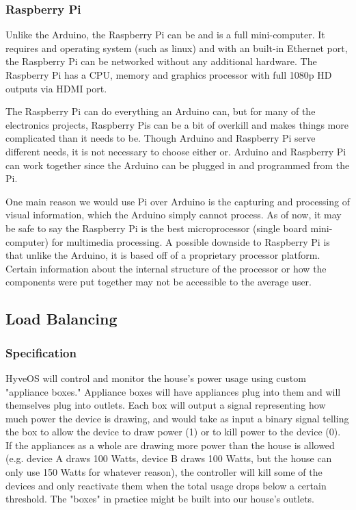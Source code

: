 	\subsubsection{Raspberry Pi}
		Unlike the Arduino, the Raspberry Pi can be and is a full mini-computer.  It requires and operating system (such as linux) and with an built-in Ethernet port, the Raspberry Pi can be networked without any additional hardware. The Raspberry Pi has a CPU, memory and graphics processor with full 1080p HD outputs via HDMI port. 
		
		The Raspberry Pi can do everything an Arduino can, but for many of the electronics projects, Raspberry Pis can be a bit of overkill and makes things more complicated than it needs to be. 
		Though Arduino and Raspberry Pi serve different needs, it is not necessary to choose either or.  Arduino and Raspberry Pi can work together since the Arduino can be plugged in and programmed from the Pi.
		
		One main reason we would use Pi over Arduino is the capturing and processing of visual information, which the Arduino simply cannot process.  As of now, it may be safe to say the Raspberry Pi is the best microprocessor (single board mini-computer) for multimedia processing.
		A possible downside to Raspberry Pi is that unlike the Arduino, it is based off of a proprietary processor platform.  
		Certain information about the internal structure of the processor or how the components were put together may not be accessible to the average user.
		
	
	\subsection{Load Balancing}
	
	\subsubsection{Specification}
		
		HyveOS will control and monitor the house's power usage using custom "appliance boxes." Appliance boxes will have appliances plug into them and will themselves plug into outlets. Each box will output a signal representing how much power the device is drawing, and would take as input a binary signal telling the box to allow the device to draw power (1) or to kill power to the device (0). If the appliances as a whole are drawing more power than the house is allowed (e.g. device A draws 100 Watts, device B draws 100 Watts, but the house can only use 150 Watts for whatever reason), the controller will kill some of the devices and only reactivate them when the total usage drops below a certain threshold. The "boxes" in practice might be built into our house's outlets.
		

